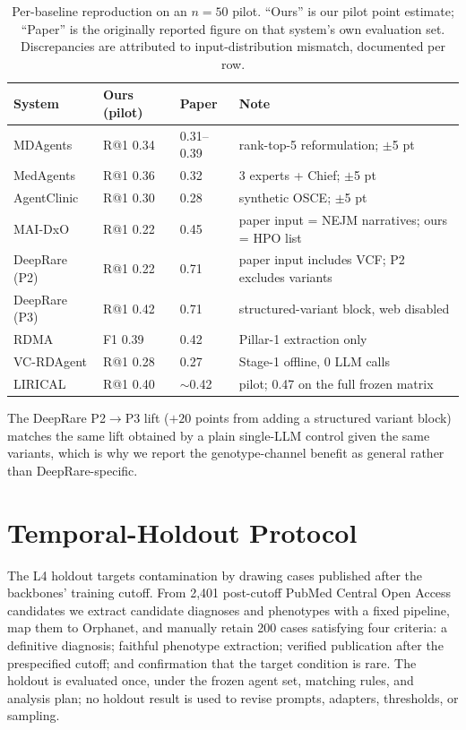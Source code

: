 \documentclass[letterpaper]{article} %
\begin{document}
\begin{table}[t]
\centering
\scriptsize
\setlength{\tabcolsep}{4pt}
\caption{Per-baseline reproduction on an $n{=}50$ pilot. ``Ours'' is our pilot
point estimate; ``Paper'' is the originally reported figure on that system's own
evaluation set. Discrepancies are attributed to input-distribution mismatch,
documented per row.}
\label{tab:repro}
\begin{tabular}{@{}llll@{}}
\toprule
System & Ours (pilot) & Paper & Note \\
\midrule
MDAgents & R@1 0.34 & 0.31--0.39 & rank-top-5 reformulation; $\pm$5 pt \\
MedAgents & R@1 0.36 & 0.32 & 3 experts + Chief; $\pm$5 pt \\
AgentClinic & R@1 0.30 & 0.28 & synthetic OSCE; $\pm$5 pt \\
MAI-DxO & R@1 0.22 & 0.45 & paper input = NEJM narratives; ours = HPO list \\
DeepRare (P2) & R@1 0.22 & 0.71 & paper input includes VCF; P2 excludes variants \\
DeepRare (P3) & R@1 0.42 & 0.71 & structured-variant block, web disabled \\
RDMA & F1 0.39 & 0.42 & Pillar-1 extraction only \\
VC-RDAgent & R@1 0.28 & 0.27 & Stage-1 offline, 0 LLM calls \\
LIRICAL & R@1 0.40 & $\sim$0.42 & pilot; 0.47 on the full frozen matrix \\
\bottomrule
\end{tabular}
\end{table}

The DeepRare P2$\rightarrow$P3 lift ($+20$ points from adding a structured
variant block) matches the same lift obtained by a plain single-LLM control
given the same variants, which is why we report the genotype-channel benefit as
general rather than DeepRare-specific.

\section{Temporal-Holdout Protocol}
\label{app:holdout}

The L4 holdout targets contamination by drawing cases published after the
backbones' training cutoff. From 2,401 post-cutoff PubMed Central Open Access
candidates we extract candidate diagnoses and phenotypes with a fixed pipeline,
map them to Orphanet, and manually retain 200 cases satisfying four criteria:
a definitive diagnosis; faithful phenotype extraction; verified publication
after the prespecified cutoff; and confirmation that the target condition is
rare. The holdout is evaluated once, under the frozen agent set, matching rules,
and analysis plan; no holdout result is used to revise prompts, adapters,
thresholds, or sampling.
\end{document}
